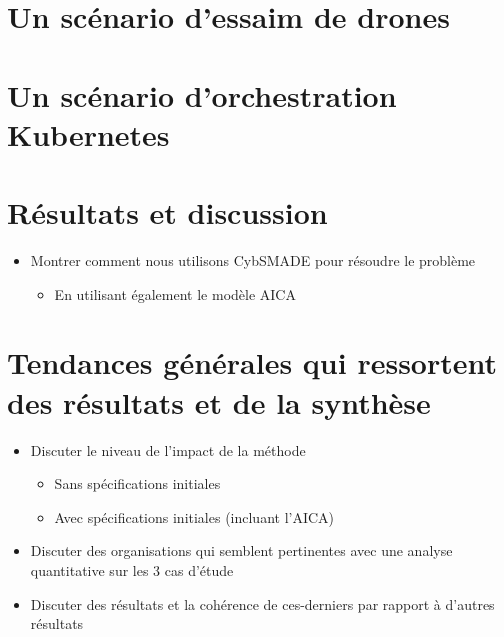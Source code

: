 

\section{Un scénario d'essaim de drones}



\section{Un scénario d'orchestration Kubernetes}



\section{Résultats et discussion}
\begin{itemize}

    \item Montrer comment nous utilisons CybSMADE pour résoudre le problème
          \begin{itemize}
              \item En utilisant également le modèle AICA
          \end{itemize}
\end{itemize}

\section{Tendances générales qui ressortent des résultats et de la synthèse}
\begin{itemize}
    \item Discuter le niveau de l'impact de la méthode
          \begin{itemize}
              \item Sans spécifications initiales
              \item Avec spécifications initiales (incluant l'AICA)
          \end{itemize}
    \item Discuter des organisations qui semblent pertinentes avec une analyse quantitative sur les 3 cas d'étude
    \item Discuter des résultats et la cohérence de ces-derniers par rapport à d'autres résultats
\end{itemize}